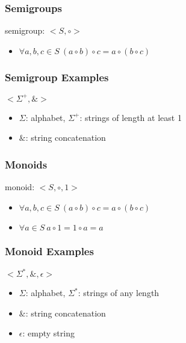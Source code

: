 \documentclass[dvipsnames]{beamer}
\begin{document}
\begin{frame}
  \frametitle{Semigroups}

  \begin{definition}
    \alert{semigroup}: $<S,\circ>$
    \begin{itemize}
      \item $\forall a,b,c \in S~(a \circ b) \circ c = a \circ (b \circ c)$
    \end{itemize}
  \end{definition}
\end{frame}

\begin{frame}
  \frametitle{Semigroup Examples}

  \begin{example}
    $<\Sigma^+,\&>$

    \begin{itemize}
      \item $\Sigma$: alphabet, $\Sigma^+$: strings of length at least 1
      \item $\&$: string concatenation
    \end{itemize}
  \end{example}
\end{frame}

\begin{frame}
  \frametitle{Monoids}

  \begin{definition}
    \alert{monoid}: $<S,\circ,1>$

    \begin{itemize}
      \item $\forall a,b,c \in S~(a \circ b) \circ c = a \circ (b \circ c)$
      \item $\forall a \in S~a \circ 1 = 1 \circ a = a$
    \end{itemize}
  \end{definition}
\end{frame}

\begin{frame}
  \frametitle{Monoid Examples}

  \begin{example}
    $<\Sigma^*,\&,\epsilon>$

    \begin{itemize}
      \item $\Sigma$: alphabet, $\Sigma^*$: strings of any length
      \item $\&$: string concatenation
      \item $\epsilon$: empty string
    \end{itemize}
  \end{example}
\end{frame}
\end{document}
